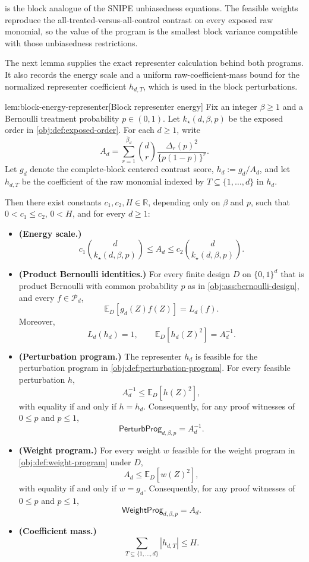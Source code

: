  is the block analogue of the SNIPE unbiasedness equations. The feasible weights reproduce the all-treated-versus-all-control contrast on every exposed raw monomial, so the value of the program is the smallest block variance compatible with those unbiasedness restrictions.

The next lemma supplies the exact representer calculation behind both programs. It also records the energy scale and a uniform raw-coefficient-mass bound for the normalized representer coefficient \(h_{d,T}\), which is used in the block perturbations.

\begin{lemmav}{lem:block-energy-representer}[Block representer energy]
Fix an integer \(\beta\ge 1\) and a Bernoulli treatment probability \(p\in(0,1)\). Let \(k_\star(d,\beta,p)\) be the exposed order in \cref{obj:def:exposed-order}. For each \(d\ge 1\), write
\[
A_d
=
\sum_{r=1}^{\bar\beta_d}
\binom d r
\frac{\Delta_r(p)^2}{\{p(1-p)\}^r}.
\]
Let \(g_d\) denote the complete-block centered contrast score, \(h_d:=g_d/A_d\), and let \(h_{d,T}\) be the coefficient of the raw monomial indexed by \(T\subseteq\{1,\ldots,d\}\) in \(h_d\).

Then there exist constants \(c_1,c_2,H\in\mathbb R\), depending only on \(\beta\) and \(p\), such that \(0<c_1\le c_2\), \(0<H\), and for every \(d\ge 1\):
\begin{itemize}
\item \textbf{(Energy scale.)}
\[
c_1\binom d {k_\star(d,\beta,p)}
\le
A_d
\le
c_2\binom d {k_\star(d,\beta,p)}.
\]
\item \textbf{(Product Bernoulli identities.)} For every finite design \(D\) on \(\{0,1\}^d\) that is product Bernoulli with common probability \(p\) as in \cref{obj:ass:bernoulli-design}, and every \(f\in\mathcal P_d\),
\[
\mathbb E_D[g_d(Z)f(Z)]
=
L_d(f).
\]
Moreover,
\[
L_d(h_d)=1,
\qquad
\mathbb E_D[h_d(Z)^2]=A_d^{-1}.
\]
\item \textbf{(Perturbation program.)} The representer \(h_d\) is feasible for the perturbation program in \cref{obj:def:perturbation-program}. For every feasible perturbation \(h\),
\[
A_d^{-1}\le \mathbb E_D[h(Z)^2],
\]
with equality if and only if \(h=h_d\). Consequently, for any proof witnesses of \(0\le p\) and \(p\le 1\),
\[
\mathsf{PerturbProg}_{d,\beta,p}=A_d^{-1}.
\]
\item \textbf{(Weight program.)} For every weight \(w\) feasible for the weight program in \cref{obj:def:weight-program} under \(D\),
\[
A_d\le \mathbb E_D[w(Z)^2],
\]
with equality if and only if \(w=g_d\). Consequently, for any proof witnesses of \(0\le p\) and \(p\le 1\),
\[
\mathsf{WeightProg}_{d,\beta,p}=A_d.
\]
\item \textbf{(Coefficient mass.)}
\[
\sum_{T\subseteq\{1,\ldots,d\}} |h_{d,T}|
\le
H.
\]
\end{itemize}
\end{lemmav}

